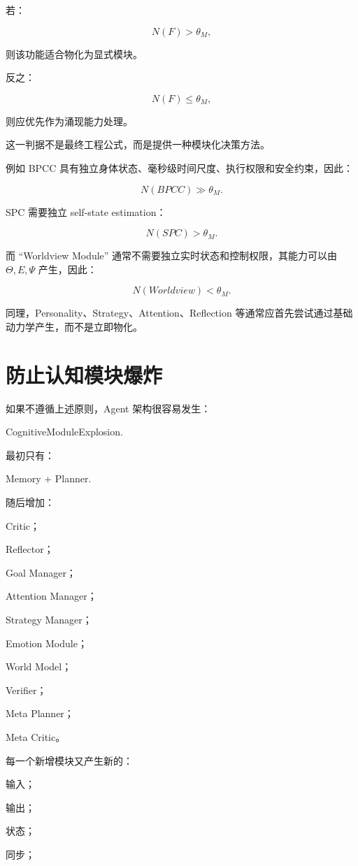 若：

\[
N(F)
>
\theta_M,
\]

则该功能适合物化为显式模块。

反之：

\[
N(F)
\leq
\theta_M,
\]

则应优先作为涌现能力处理。

这一判据不是最终工程公式，而是提供一种模块化决策方法。

例如 BPCC 具有独立身体状态、毫秒级时间尺度、执行权限和安全约束，因此：

\[
N(BPCC)\gg\theta_M.
\]

SPC 需要独立 self-state estimation：

\[
N(SPC)>\theta_M.
\]

而 ``Worldview Module'' 通常不需要独立实时状态和控制权限，其能力可以由 $\Theta,E,\Psi$ 产生，因此：

\[
N(Worldview)
<
\theta_M.
\]

同理，Personality、Strategy、Attention、Reflection 等通常应首先尝试通过基础动力学产生，而不是立即物化。

\section{防止认知模块爆炸}

如果不遵循上述原则，Agent 架构很容易发生：

\begin{statementbox}
CognitiveModuleExplosion.
\end{statementbox}

最初只有：

Memory + Planner.

随后增加：

Critic；

Reflector；

Goal Manager；

Attention Manager；

Strategy Manager；

Emotion Module；

World Model；

Verifier；

Meta Planner；

Meta Critic。

每一个新增模块又产生新的：

输入；

输出；

状态；

同步；

